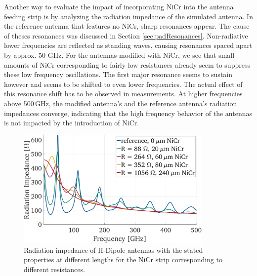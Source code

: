 Another way to evaluate the impact of incorporating NiCr into the antenna feeding strip is by analyzing the radiation impedance of the simulated antenna. In the reference antenna that features no NiCr, sharp resonances appear. The cause of theses resonances was discussed in Section \ref{sec:padResonances}. Non-radiative lower frequencies are reflected as standing waves, causing resonances spaced apart by approx. \num{50} \si{\giga \hertz}. For the antennas modified with NiCr, we see that small amounts of NiCr corresponding to fairly low resistances already seem to suppress these low frequency oscillations. The first major resonance seems to sustain however and seems to be shifted to even lower frequencies. The actual effect of this resonance shift has to be observed in measurements.  At higher frequencies above \num{500}\,\si{\giga \hertz}, the modified antenna's and the reference antenna's radiation impedances converge, indicating that the high frequency behavior of the antennas is not impacted by the introduction of NiCr. 


\begin{figure}[!]
    \centering
    \includegraphics[width=0.85\textwidth]{figures/sim_rad_imp_H_Dipoles.pdf}
    \caption{Radiation impedance of H-Dipole antennas with the stated properties at different lengths for the NiCr strip corresponding to different resistances.}
    \label{}
\end{figure}


